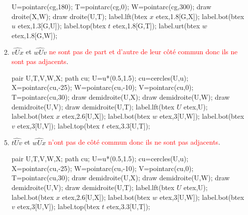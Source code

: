 \begin{corrige}
\begin{enumerate}
\begin{Geometrie}[CoinHD={(4u,3.5u)}]
            U=pointarc(cg,180);
            T=pointarc(cg,0);
            W=pointarc(cg,300);
            draw droite(X,W);
            draw droite(U,T);
            label.lft(btex $x$ etex,1.8[G,X]);
            label.bot(btex $u$ etex,1.3[G,U]);
            label.top(btex $t$ etex,1.8[G,T]);
            label.urt(btex $w$ etex,1.8[G,W]);
        \end{Geometrie}        
        \item $\widehat{vUx}$ et $\widehat{wUv}$ \textcolor{red}{ne sont pas de part et d'autre de leur côté commun donc ils ne sont pas adjacents}.\par
        \hspace*{-5mm}
        \begin{Geometrie}[CoinHD={(4u,3.5u)}]
            pair U,T,V,W,X;
            path cu;
            U=u*(0.5,1.5);
            cu=cercles(U,u);
            X=pointarc(cu,-25);
            W=pointarc(cu,-10);
            V=pointarc(cu,0);
            T=pointarc(cu,30);
            draw demidroite(U,X);
            draw demidroite(U,W);
            draw demidroite(U,V);
            draw demidroite(U,T);
            label.lft(btex $U$ etex,U);
            label.bot(btex $x$ etex,2.6[U,X]);            
            label.bot(btex $w$ etex,3[U,W]);
            label.bot(btex $v$ etex,3[U,V]);
            label.top(btex $t$ etex,3.3[U,T]);            
        \end{Geometrie}
    \end{enumerate}
        \Coupe
    \begin{enumerate}
        \setcounter{enumi}{4}
        \item $\widehat{tUv}$ et $\widehat{wUx}$ \textcolor{red}{n'ont pas de côté commun donc ils ne sont pas adjacents}.\par
        \hspace*{-5mm}
        \begin{Geometrie}[CoinHD={(4u,3.5u)}]
            pair U,T,V,W,X;
            path cu;
            U=u*(0.5,1.5);
            cu=cercles(U,u);
            X=pointarc(cu,-25);
            W=pointarc(cu,-10);
            V=pointarc(cu,0);
            T=pointarc(cu,30);
            draw demidroite(U,X);
            draw demidroite(U,W);
            draw demidroite(U,V);
            draw demidroite(U,T);
            label.lft(btex $U$ etex,U);
            label.bot(btex $x$ etex,2.6[U,X]);            
            label.bot(btex $w$ etex,3[U,W]);
            label.bot(btex $v$ etex,3[U,V]);
            label.top(btex $t$ etex,3.3[U,T]);            

\end{Geometrie}
\end{enumerate}
\end{corrige}
